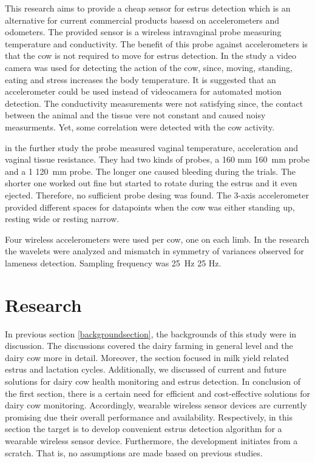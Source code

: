\documentclass[english,12pt,a4paper,pdftex,elec,utf8]{aaltothesis}
\begin{document}
This research aims to provide a cheap sensor for estrus detection which is an alternative for current commercial products basesd on accelerometers and odometers. The provided sensor is a wireless intravaginal probe measuring temperature and conductivity. The benefit of this probe against accelerometers is that the cow is not required to move for estrus detection. In the study a video camera was used for detecting the action of the cow, since, moving, standing, eating and stress increases the body temperature. It is suggested that an accelerometer could be used instead of videocamera for automated motion detection. The conductivity measurements were not satisfying since, the contact between the animal and the tissue vere not constant and caused noisy measurments. Yet, some correlation were detected with the cow activity.  \cite{7370219}


in the further study the probe measured vaginal temperature, acceleration and vaginal tissue resistance. They had two kinds of probes, a 160 mm \SI{160}{\milli \metre} probe and a 1 \SI{120}{\milli \metre} probe. The longer one caused bleeding during the trials. The shorter one worked out fine but started to rotate during the estrus and it even ejected. Therefore, no sufficient probe desing was found. The 3-axis accelerometer provided different spaces for datapoints when the cow was either standing up, resting wide or resting narrow. \cite{Andersson2016101}

Four wireless accelerometers were used per cow, one on each limb. In the research the wavelets were analyzed and mismatch in symmetry of variances observed for lameness detection. Sampling frequency was  \SI{25}{\hertz} 25 Hz.  \cite{Pastell2009545}


\clearpage

\section{Research} \label{researchsection}

In previous section \ref{backgroundsection}, the backgrounds of this study were in discussion. The discussions covered the dairy farming in general level and the dairy cow more in detail. Moreover, the section focused in milk yield related estrus and lactation cycles. Additionally, we discussed of current and future solutions for dairy cow health monitoring and estrus detection. In conclusion of the first section, there is a certain need for efficient and cost-effective solutions for dairy cow monitoring. Accordingly, wearable wireless sensor devices are currently promising due their overall performance and availability. Respectively, in this section the target is to develop convenient estrus detection algorithm for a wearable wireless sensor device. Furthermore, the development initiates from a scratch. That is, no assumptions are made based on previous studies. \\
\end{document}
